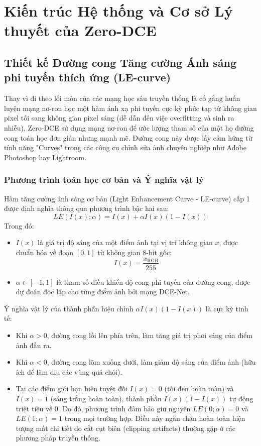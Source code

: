 \documentclass[a4paper]{article}
\begin{document}
\clearpage

\section{Kiến trúc Hệ thống và Cơ sở Lý thuyết của Zero-DCE}

\subsection{Thiết kế Đường cong Tăng cường Ánh sáng phi tuyến thích ứng (LE-curve)}
Thay vì đi theo lối mòn của các mạng học sâu truyền thống là cố gắng huấn luyện mạng nơ-ron học một hàm ánh xạ phi tuyến cực kỳ phức tạp từ không gian pixel tối sang không gian pixel sáng (dễ dẫn đến việc overfitting và sinh ra nhiễu), Zero-DCE sử dụng mạng nơ-ron để ước lượng tham số của một họ đường cong toán học đơn giản nhưng mạnh mẽ. Đường cong này được lấy cảm hứng từ tính năng "Curves" trong các công cụ chỉnh sửa ảnh chuyên nghiệp như Adobe Photoshop hay Lightroom.

\subsubsection{Phương trình toán học cơ bản và Ý nghĩa vật lý}
Hàm tăng cường ánh sáng cơ bản (Light Enhancement Curve - LE-curve) cấp 1 được định nghĩa thông qua phương trình bậc hai sau:
\begin{equation}
    LE(I(x); \alpha) = I(x) + \alpha I(x)(1 - I(x))
\end{equation}
Trong đó:
\begin{itemize}
    \item $I(x)$ là giá trị độ sáng của một điểm ảnh tại vị trí không gian $x$, được chuẩn hóa về đoạn $[0, 1]$ từ không gian 8-bit gốc:
    \begin{equation}
        I(x) = \frac{x_{\text{RGB}}}{255}
    \end{equation}
    \item $\alpha \in [-1, 1]$ là tham số điều khiển độ cong phi tuyến của đường cong, được dự đoán độc lập cho từng điểm ảnh bởi mạng DCE-Net. 
\end{itemize}

Ý nghĩa vật lý của thành phần hiệu chỉnh $\alpha I(x)(1 - I(x))$ là cực kỳ tinh tế:
\begin{itemize}
    \item Khi $\alpha > 0$, đường cong lồi lên phía trên, làm tăng giá trị phơi sáng của điểm ảnh đầu ra.
    \item Khi $\alpha < 0$, đường cong lõm xuống dưới, làm giảm độ sáng của điểm ảnh (hữu ích để làm dịu các vùng quá chói).
    \item Tại các điểm giới hạn biên tuyệt đối $I(x) = 0$ (tối đen hoàn toàn) và $I(x) = 1$ (sáng trắng hoàn toàn), thành phần $I(x)(1-I(x))$ tự động triệt tiêu về $0$. Do đó, phương trình đảm bảo giữ nguyên $LE(0; \alpha) = 0$ và $LE(1; \alpha) = 1$ trong mọi trường hợp. Điều này ngăn chặn hoàn toàn hiện tượng mất chi tiết do cắt cụt biên (clipping artifacts) thường gặp ở các phương pháp truyền thống.
\end{itemize}
\end{document}
